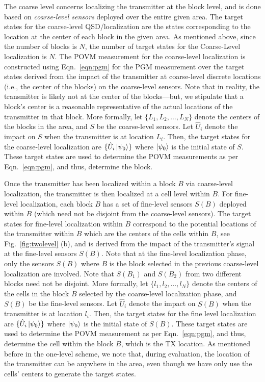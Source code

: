 The coarse level concerns localizing the transmitter at the block level, and is done based on {\em coarse-level sensors} deployed over the entire given area. The target states for the coarse-level QSD/localization are the states corresponding to the location at the center of each block in the given area. As mentioned above, since the number of blocks is $N$, the number of target states for the Coarse-Level localization is $N$. The POVM measurement for the coarse-level localization is constructed using 
Eqn.~\ref{eqn:pgm} for the PGM measurement over the target states derived from the impact of 
the transmitter at coarse-level discrete locations (i.e., the center of the blocks) on the coarse-level sensors.
Note that in reality, the transmitter is likely not at the center of the blocks---but, we stipulate that a block's center is a reasonable representative of the actual locations of the transmitter in that block.
More formally, let $\{L_1, L_2, \ldots, L_N\}$ denote the centers of the blocks in the
area, and $S$ be the coarse-level sensors. Let $\hat{U}_i$ denote the impact on $S$ when the transmitter is at location $L_i$. Then, the target states for the coarse-level localization 
are $\{\hat{U}_i \ket{\psi_0}\}$ where $\ket{\psi_0}$ is the initial state of $S$. 
These target states are used to determine the POVM measurements as per Eqn.~\ref{eqn:pgm}, and thus, determine the block.


Once the transmitter has been localized within a block $B$ via coarse-level localization, the 
transmitter is then localized at a cell level within $B$. For fine-level localization, each block $B$ has a set of fine-level sensors $S(B)$ deployed within $B$ (which need not be 
disjoint from the coarse-level sensors). 
The target states for fine-level localization within $B$ correspond 
to the potential locations of the transmitter within $B$ which are the centers
of the cells within $B$, see Fig.~\ref{fig:twolevel} (b), and is derived from the impact of the transmitter's signal at
the fine-level sensors $S(B)$. 
Note that at the fine-level localization phase, only the sensors $S(B)$ where $B$ is the block selected in the previous coarse-level localization are involved. Note that $S(B_1)$ and $S(B_2)$ from two different blocks need not be disjoint. 
More formally, let $\{l_1, l_2, \ldots, l_N\}$ denote the centers of the cells in the
block $B$ selected by the coarse-level localization phase, and $S(B)$ be the fine-level sensors. Let $\hat{U}_i$ denote the impact on $S(B)$ when the transmitter is at location $l_i$. Then, the target states for the fine level localization 
are $\{\hat{U}_i \ket{\psi_0}\}$ where $\ket{\psi_0}$ is the initial state of $S(B)$. These target states
are used to determine the POVM measurement as per Eqn.~\ref{eqn:pgm}, and thus, determine
the cell within the block $B$, which is the TX location. 
As mentioned before in the one-level scheme, we note that, during evaluation, the location of the transmitter can be anywhere in 
the area, even though we have only use the cells' centers to generate the target states.


